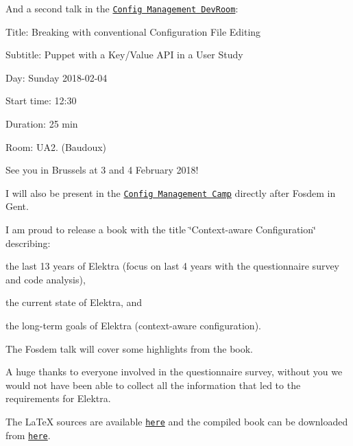 And a second talk in the \href{https://fosdem.org/2018/schedule/event/puppet_key_value/}{\tt Config Management Dev\+Room}\+:


\begin{DoxyItemize}
\item Title\+: Breaking with conventional Configuration File Editing
\item Subtitle\+: Puppet with a Key/\+Value A\+PI in a User Study
\item Day\+: Sunday 2018-\/02-\/04
\item Start time\+: 12\+:30
\item Duration\+: 25 min
\item Room\+: U\+A2. (Baudoux)
\end{DoxyItemize}

See you in Brussels at 3 and 4 February 2018!

I will also be present in the \href{http://cfgmgmtcamp.eu/}{\tt Config Management Camp} directly after Fosdem in Gent.

I am proud to release a book with the title \char`\"{}\+Context-\/aware Configuration\char`\"{} describing\+:


\begin{DoxyItemize}
\item the last 13 years of Elektra (focus on last 4 years with the questionnaire survey and code analysis),
\item the current state of Elektra, and
\item the long-\/term goals of Elektra (context-\/aware configuration).
\end{DoxyItemize}

The Fosdem talk will cover some highlights from the book.

A huge thanks to everyone involved in the questionnaire survey, without you we would not have been able to collect all the information that led to the requirements for Elektra.

The La\+TeX sources are available \href{https://book.libelektra.org}{\tt here} and the compiled book can be downloaded from \href{https://www.libelektra.org/ftp/elektra/publications/raab2017context.pdf}{\tt here}.


